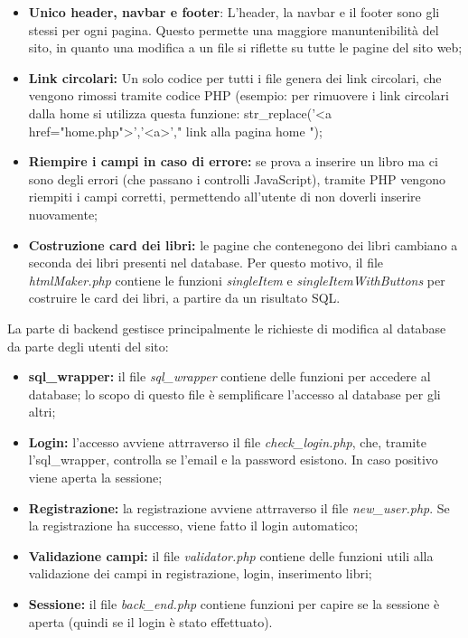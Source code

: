 \begin{itemize}
    \item \textbf{Unico header, navbar e footer}: L'header, la navbar e il footer sono gli stessi per ogni pagina. Questo permette una maggiore manuntenibilità del sito, in quanto una modifica a un file si riflette su tutte le pagine del sito web;
    \item \textbf{Link circolari:} Un solo codice per tutti i file genera dei link circolari, che vengono rimossi tramite codice PHP (esempio: per rimuovere i link circolari dalla home si utilizza questa funzione: str\_replace('<a href="home.php">','<a>',"\- link alla pagina home \-");
    \item \textbf{Riempire i campi in caso di errore:} se prova a inserire un libro ma ci sono degli errori (che passano i controlli JavaScript), tramite PHP vengono riempiti i campi corretti, permettendo all'utente di non doverli inserire nuovamente;
    \item \textbf{Costruzione card dei libri:} le pagine che contenegono dei libri cambiano a seconda dei libri presenti nel database. Per questo motivo, il file \textit{htmlMaker.php} contiene le funzioni \textit{singleItem} e \textit{singleItemWithButtons} per costruire le card dei libri, a partire da un risultato SQL.
\end{itemize}
La parte di backend gestisce principalmente le richieste di modifica al database da parte degli utenti del sito:
\begin{itemize}
    \item \textbf{sql\_wrapper:} il file \textit{sql\_wrapper} contiene delle funzioni per accedere al database; lo scopo di questo file è semplificare l'accesso al database per gli altri;  
    \item \textbf{Login:} l'accesso avviene attrraverso il file \textit{check\_login.php}, che, tramite l'sql\_wrapper, controlla se l'email e la password esistono. In caso positivo viene aperta la sessione;
    \item \textbf{Registrazione:} la registrazione avviene attrraverso il file \textit{new\_user.php}. Se la registrazione ha successo, viene fatto il login automatico;
    \item \textbf{Validazione campi:} il file \textit{validator.php} contiene delle funzioni utili alla validazione dei campi in registrazione, login, inserimento libri;
    \item \textbf{Sessione:} il file \textit{back\_end.php} contiene funzioni per capire se la sessione è aperta (quindi se il login è stato effettuato).
\end{itemize}